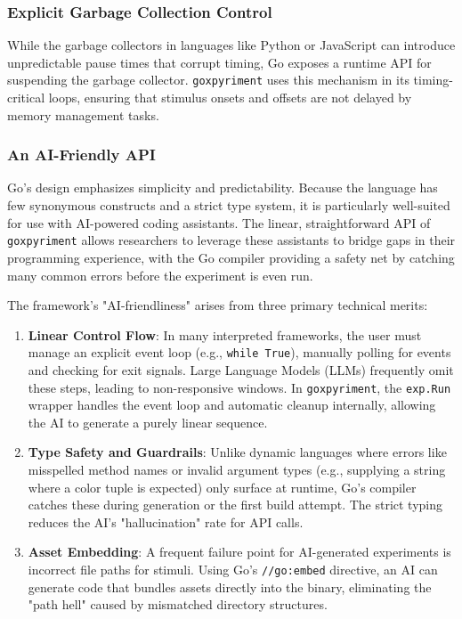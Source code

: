 \documentclass[jou,a4paper]{apa7}
\begin{document}
\subsubsection{Explicit Garbage Collection Control}\label{explicit-gc-control}

While the garbage collectors in languages like Python or JavaScript can
introduce unpredictable pause times that corrupt timing, Go exposes a runtime
API for suspending the garbage collector. \texttt{goxpyriment} uses this mechanism in its timing-critical loops, ensuring
that stimulus onsets and offsets are not delayed by memory management tasks.

\subsubsection{An AI-Friendly API}\label{ai-friendly-api}

Go's design emphasizes simplicity and predictability. Because the language has
few synonymous constructs and a strict type system, it is particularly
well-suited for use with AI-powered coding assistants. The linear,
straightforward API of \texttt{goxpyriment} allows researchers to leverage these
assistants to bridge gaps in their programming experience, with the Go compiler
providing a safety net by catching many common errors before the experiment is
even run.

The framework's "AI-friendliness" arises from three primary technical
merits:

\begin{enumerate}
    \item \textbf{Linear Control Flow}: In many interpreted frameworks, the user
    must manage an explicit event loop (e.g., \texttt{while True}), manually
    polling for events and checking for exit signals. Large Language Models (LLMs)
    frequently omit these steps, leading to non-responsive windows. In
    \texttt{goxpyriment}, the \texttt{exp.Run} wrapper handles the event loop and
    automatic cleanup internally, allowing the AI to generate a purely linear
    sequence.
    \item \textbf{Type Safety and Guardrails}: Unlike dynamic languages where
    errors like misspelled method names or invalid argument types (e.g.,
    supplying a string where a color tuple is expected) only surface at runtime,
    Go’s compiler catches these during generation or the first build attempt.
    The strict typing reduces the AI's "hallucination" rate for API calls.
    \item \textbf{Asset Embedding}: A frequent failure point for AI-generated
    experiments is incorrect file paths for stimuli. Using Go's
    \texttt{//go:embed} directive, an AI can generate code that bundles assets
    directly into the binary, eliminating the "path hell" caused by mismatched
    directory structures.
\end{enumerate}
\end{document}
